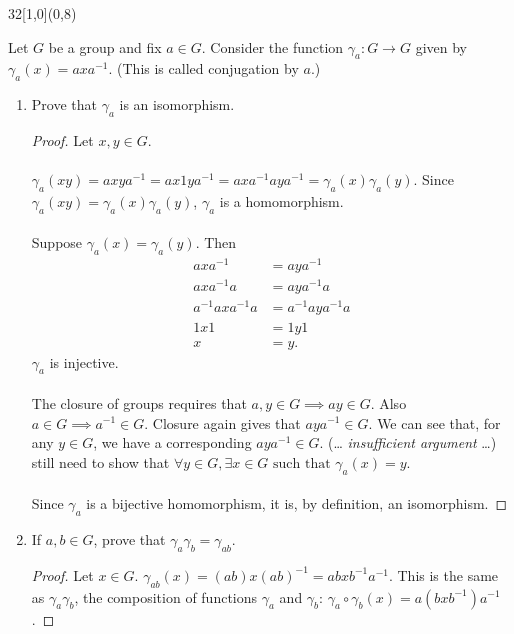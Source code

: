 \documentclass[12pt]{article}
\newenvironment{exercise}[2]{\begin{textblock}{32}[1,0](0,#2)\noindent#1\end{textblock}}{\vspace{1in}}
\begin{document}
\begin{exercise}{1.47}{8}
	{\noindent}Let $G$ be a group and fix $a\in G$. Consider the function $\gamma_a:G\to G$ given by $\gamma_a(x)=axa^{-1}$. (This is called conjugation by $a$.)
	\begin{enumerate}[(i.)]
		\item Prove that $\gamma_a$ is an isomorphism.
		\bigskip
		\begin{proof}
			Let $x,y\in G$.\\
			\\
			$\gamma_a(xy)=axya^{-1}=ax1ya^{-1}=axa^{-1}aya^{-1}=\gamma_a(x)\gamma_a(y)$.
			Since $\gamma_a(xy)=\gamma_a(x)\gamma_a(y)$, $\gamma_a$ is a homomorphism.\\
			\\
			Suppose $\gamma_a(x)=\gamma_a(y)$. Then
			\begin{align*}
				axa^{-1}&=aya^{-1}\\
				axa^{-1}a&=aya^{-1}a\\
				a^{-1}axa^{-1}a&=a^{-1}aya^{-1}a\\
				1x1&=1y1\\
				x&=y.
			\end{align*}
			$\gamma_a$ is injective.\\
			\\
			The closure of groups requires that $a,y\in G\implies ay\in G$. Also $a\in G\implies a^{-1}\in G$. Closure again gives that $aya^{-1}\in G$. We can see that, for any $y\in G$, we have a corresponding $aya^{-1}\in G$.
			(\dots\textit{ insufficient argument }\dots) still need to show that $\forall y\in G,\exists x\in G\text{ such that }\gamma_a(x)=y$.\\
			\\
			Since $\gamma_a$ is a bijective homomorphism, it is, by definition, an isomorphism.
		\end{proof}

		\item If $a,b\in G$, prove that $\gamma_a\gamma_b=\gamma_{ab}$.
		\bigskip
		\begin{proof}
			Let $x\in G$. $\gamma_{ab}(x)=(ab)x(ab)^{-1}=abxb^{-1}a^{-1}$. This is the same as $\gamma_a\gamma_b$, the composition of functions $\gamma_a$ and $\gamma_b$: $\gamma_a\circ \gamma_b(x)=a(bxb^{-1})a^{-1}$.
		\end{proof}
	\end{enumerate}
\end{exercise}

\newpage
\end{document}

